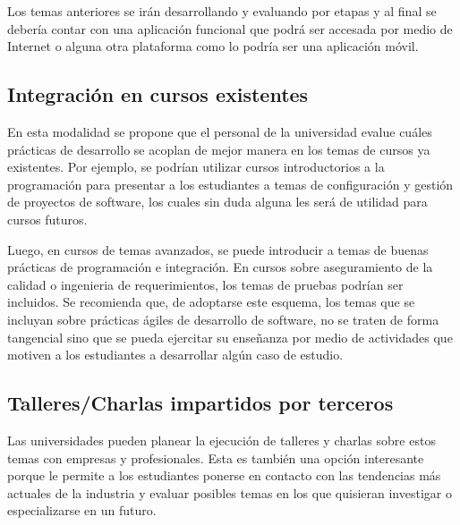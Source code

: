 Los temas anteriores se irán desarrollando y evaluando por etapas y al final se debería contar con una aplicación funcional que podrá ser accesada por medio de Internet o alguna otra plataforma como lo podría ser una aplicación móvil.


\subsection{Integración en cursos existentes}
En esta modalidad se propone que el personal de la universidad evalue cuáles prácticas de desarrollo se acoplan de mejor manera en los temas de cursos ya existentes. Por ejemplo, se podrían utilizar cursos introductorios a la programación para presentar a los estudiantes a temas de configuración y gestión de proyectos de software, los cuales sin duda alguna les será de utilidad para cursos futuros.

Luego, en cursos de temas avanzados, se puede introducir a temas de buenas prácticas de programación e integración. En cursos sobre aseguramiento de la calidad o ingenieria de requerimientos, los temas de pruebas podrían ser incluidos. Se recomienda que, de adoptarse este esquema, los temas que se incluyan sobre prácticas ágiles de desarrollo de software, no se traten de forma tangencial sino que se pueda ejercitar su enseñanza por medio de actividades que motiven a los estudiantes a desarrollar algún caso de estudio.


\subsection{Talleres/Charlas impartidos por terceros}
Las universidades pueden planear la ejecución de talleres y charlas sobre estos temas con empresas y profesionales. Esta es también una opción interesante porque le permite a los estudiantes ponerse en contacto con las tendencias más actuales de la industria y evaluar posibles temas en los que quisieran investigar o especializarse en un futuro.